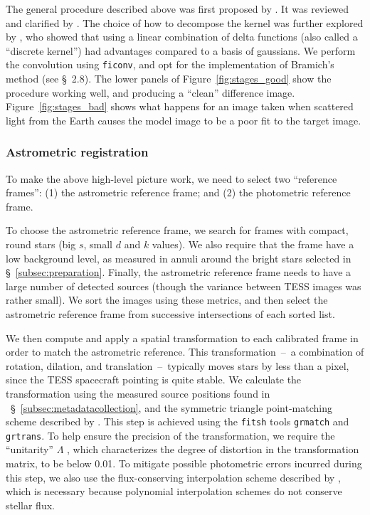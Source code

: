 \documentclass[12pt,twocolumn,tighten,trackchanges]{aastex62}
\begin{document}
The general procedure described above was first proposed by
\citet{Alard_Lupton_1998}.  It was reviewed and clarified by
\citet{miller_optimal_2008}.  The choice of how to decompose the
kernel was further explored by \citet{bramich_new_2008}, who showed
that using a linear combination of delta functions (also called a
``discrete kernel'') had advantages compared to a basis of gaussians.
We perform the convolution using \texttt{ficonv}, and opt for the
implementation of Bramich's method (see \citealt{Pal_2009} \S~2.8).
The lower panels of Figure~\ref{fig:stages_good} show the procedure
working well, and producing a ``clean'' difference image.
Figure~\ref{fig:stages_bad} shows what happens for an image taken when
scattered light from the Earth causes the model image to be a poor fit
to the target image.


\subsubsection{Astrometric registration}

To make the above high-level picture work, we need to select two
``reference frames'': (1) the astrometric reference frame; and (2) the
photometric reference frame.

To choose the astrometric reference frame, we search for frames with
compact, round stars (big $s$, small $d$ and $k$ values).  We also
require that the frame have a low background level, as measured in
annuli around the bright stars selected in
\S~\ref{subsec:preparation}.  Finally, the astrometric reference frame
needs to have a large number of detected sources (though the variance
between TESS images was rather small).  We sort the images using these
metrics, and then select the astrometric reference frame from
successive intersections of each sorted list.

We then compute and apply a spatial transformation 
to each calibrated frame in order to match the astrometric reference.
This transformation~--~a combination of rotation, dilation, and
translation~--~typically moves stars by less than a pixel, since the
TESS spacecraft pointing is quite stable.  We calculate the
transformation using the measured source positions found in
~\S~\ref{subsec:metadatacollection}, and the symmetric triangle
point-matching scheme described by \citet[][~\S~2.5.2]{Pal_2009}.
This step is achieved using the \texttt{fitsh} tools \texttt{grmatch}
and \texttt{grtrans}.  To help ensure the precision of the
transformation, we require the ``unitarity'' $\Lambda$
\citep[][~Eq.~54]{Pal_2009}, which characterizes the degree of
distortion in the transformation matrix, to be below 0.01.  To
mitigate possible photometric errors incurred during this step, we
also use the flux-conserving interpolation scheme described by
\citet{Pal_2009}, which is necessary because polynomial interpolation
schemes do not conserve stellar flux. 
\end{document}
